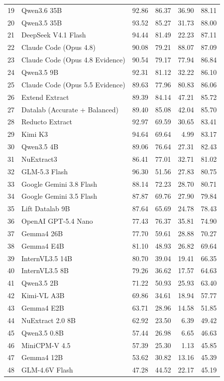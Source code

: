 \begin{tabularx}{\linewidth}{@{}rYrrrr@{}}
19 & Qwen3.6 35B & 92.86 & 86.37 & 36.90 & 88.11\\
20 & Qwen3.5 35B & 93.52 & 85.27 & 31.73 & 88.00\\
21 & DeepSeek V4.1 Flash & 94.44 & 81.49 & 22.23 & 87.11\\
22 & Claude Code (Opus 4.8) & 90.08 & 79.21 & 88.07 & 87.09\\
23 & Claude Code (Opus 4.8 Evidence) & 90.54 & 79.17 & 77.94 & 86.84\\
24 & Qwen3.5 9B & 92.31 & 81.12 & 32.22 & 86.10\\
25 & Claude Code (Opus 5.5 Evidence) & 89.63 & 77.96 & 80.83 & 86.06\\
26 & Extend Extract & 89.39 & 84.14 & 47.21 & 85.72\\
27 & Datalab (Accurate + Balanced) & 89.40 & 85.08 & 42.04 & 85.70\\
28 & Reducto Extract & 92.97 & 69.59 & 30.65 & 83.41\\
29 & Kimi K3 & 94.64 & 69.64 & 4.99 & 83.17\\
30 & Qwen3.5 4B & 89.06 & 76.64 & 27.31 & 82.43\\
31 & NuExtract3 & 86.41 & 77.01 & 32.71 & 81.02\\
32 & GLM-5.3 Flash & 96.30 & 51.56 & 27.83 & 80.75\\
33 & Google Gemini 3.8 Flash & 88.14 & 72.23 & 28.70 & 80.71\\
34 & Google Gemini 3.5 Flash & 87.87 & 69.76 & 27.90 & 79.84\\
35 & Lift Datalab 9B & 87.64 & 65.69 & 24.78 & 78.43\\
36 & OpenAI GPT-5.4 Nano & 77.43 & 76.37 & 35.81 & 74.90\\
37 & Gemma4 26B & 77.70 & 59.61 & 28.88 & 70.27\\
38 & Gemma4 E4B & 81.10 & 48.93 & 26.82 & 69.64\\
39 & InternVL3.5 14B & 80.70 & 39.04 & 19.41 & 66.35\\
40 & InternVL3.5 8B & 79.26 & 36.62 & 17.57 & 64.63\\
41 & Qwen3.5 2B & 71.22 & 50.93 & 25.93 & 63.40\\
42 & Kimi-VL A3B & 69.86 & 34.61 & 18.94 & 57.77\\
43 & Gemma4 E2B & 63.71 & 28.96 & 14.58 & 51.85\\
44 & NuExtract 2.0 8B & 62.92 & 23.50 & 6.39 & 49.42\\
45 & Qwen3.5 0.8B & 57.44 & 26.98 & 6.65 & 46.63\\
46 & MiniCPM-V 4.5 & 57.39 & 25.30 & 1.13 & 45.85\\
47 & Gemma4 12B & 53.62 & 30.82 & 13.16 & 45.39\\
48 & GLM-4.6V Flash & 47.28 & 44.52 & 22.17 & 45.19\\
\bottomrule\end{tabularx}\endgroup

